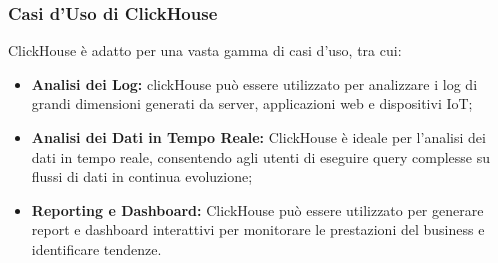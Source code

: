 \subsubsection*{Casi d'Uso di ClickHouse}
ClickHouse è adatto per una vasta gamma di casi d'uso, tra cui:
\begin{itemize}
    \item \textbf{Analisi dei Log:} clickHouse può essere utilizzato per analizzare i log di grandi dimensioni generati da server, applicazioni web e dispositivi IoT;
    \item \textbf{Analisi dei Dati in Tempo Reale:} ClickHouse è ideale per l'analisi dei dati in tempo reale, consentendo agli utenti di eseguire query complesse su flussi di dati in continua evoluzione;
    \item \textbf{Reporting e Dashboard:} ClickHouse può essere utilizzato per generare report e dashboard interattivi per monitorare le prestazioni del business e identificare tendenze.
\end{itemize}


